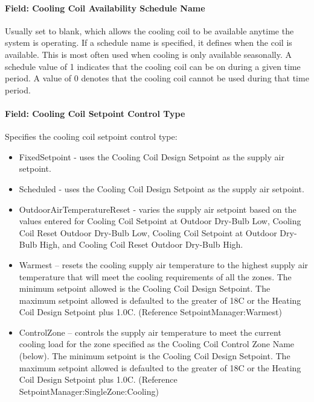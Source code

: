 \paragraph{Field: Cooling Coil Availability Schedule Name}\label{field-cooling-coil-availability-schedule-name-9}

Usually set to blank, which allows the cooling coil to be available anytime the system is operating. If a schedule name is specified, it defines when the coil is available. This is most often used when cooling is only available seasonally. A schedule value of 1 indicates that the cooling coil can be on during a given time period. A value of 0 denotes that the cooling coil cannot be used during that time period.

\paragraph{Field: Cooling Coil Setpoint Control Type}\label{field-cooling-coil-setpoint-control-type}

Specifies the cooling coil setpoint control type:

\begin{itemize}
\item
  FixedSetpoint - uses the Cooling Coil Design Setpoint as the supply air setpoint.
\item
  Scheduled - uses the Cooling Coil Design Setpoint as the supply air setpoint.
\item
  OutdoorAirTemperatureReset - varies the supply air setpoint based on the values entered for Cooling Coil Setpoint at Outdoor Dry-Bulb Low, Cooling Coil Reset Outdoor Dry-Bulb Low, Cooling Coil Setpoint at Outdoor Dry-Bulb High, and Cooling Coil Reset Outdoor Dry-Bulb High.
\item
  Warmest -- resets the cooling supply air temperature to the highest supply air temperature that will meet the cooling requirements of all the zones. The minimum setpoint allowed is the Cooling Coil Design Setpoint. The maximum setpoint allowed is defaulted to the greater of 18C or the Heating Coil Design Setpoint plus 1.0C. (Reference SetpointManager:Warmest)
\item
  ControlZone -- controls the supply air temperature to meet the current cooling load for the zone specified as the Cooling Coil Control Zone Name (below). The minimum setpoint is the Cooling Coil Design Setpoint. The maximum setpoint allowed is defaulted to the greater of 18C or the Heating Coil Design Setpoint plus 1.0C. (Reference SetpointManager:SingleZone:Cooling)
\end{itemize}

